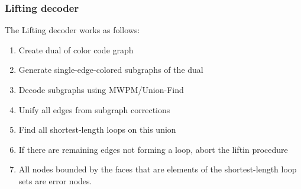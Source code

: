 \subsubsection{Lifting decoder}\label{sec: lifting}
The Lifting decoder works as follows:
\begin{enumerate}
    \item Create dual of color code graph
    \item Generate single-edge-colored subgraphs of the dual
    \item Decode subgraphs using MWPM/Union-Find
    \item Unify all edges from subgraph corrections
    \item Find all shortest-length loops on this union
    \item If there are remaining edges not forming a loop, abort the liftin procedure
    \item All nodes bounded by the faces that are elements of the shortest-length loop sets
    are error nodes. 
\end{enumerate}

